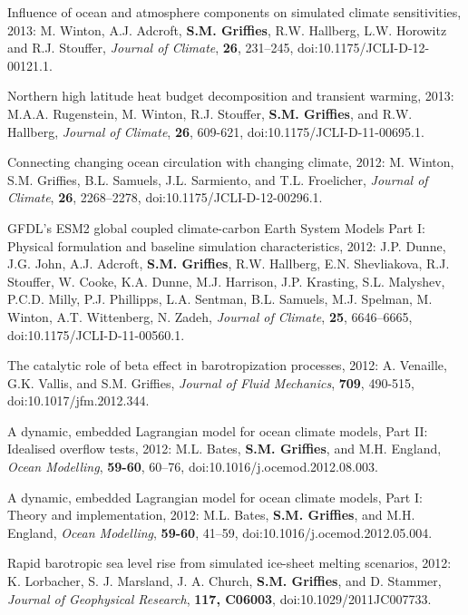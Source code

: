\begin{etaremune}
\item Influence of ocean and atmosphere components on simulated
  climate sensitivities, 2013: M. Winton, A.J. Adcroft, {\bf
    S.M. Grif\/f\/ies}, R.W. Hallberg, L.W. Horowitz and
  R.J. Stouffer, {\it Journal of Climate}, {\bf 26}, 231--245,
  doi:10.1175/JCLI-D-12-00121.1.

\item Northern high latitude heat budget decomposition and transient
  warming, 2013: M.A.A. Rugenstein, M. Winton, R.J. Stouffer, {\bf
    S.M. Grif\/f\/ies}, and R.W. Hallberg, {\it Journal of Climate}, {\bf 26}, 609-621, doi:10.1175/JCLI-D-11-00695.1.

\item Connecting changing ocean circulation with changing climate,
  2012: M. Winton, S.M. Grif\/f\/ies, B.L. Samuels,
  J.L. Sarmiento, and T.L. Froelicher, {\it Journal of Climate}, {\bf 26}, 2268--2278, doi:10.1175/JCLI-D-12-00296.1.

\item GFDL’s ESM2 global coupled climate-carbon Earth System Models
  Part I: Physical formulation and baseline simulation
  characteristics, 2012: J.P. Dunne, J.G. John, A.J. Adcroft, {\bf
    S.M. Grif\/f\/ies}, R.W. Hallberg, E.N. Shevliakova, R.J. Stouffer,
  W. Cooke, K.A. Dunne, M.J. Harrison, J.P. Krasting, S.L. Malyshev,
  P.C.D. Milly, P.J. Phillipps, L.A. Sentman, B.L. Samuels,
  M.J. Spelman, M. Winton, A.T. Wittenberg, N. Zadeh, {\it Journal of
    Climate}, {\bf 25}, 6646--6665,
doi:10.1175/JCLI-D-11-00560.1.

\item The catalytic role of beta effect in barotropization processes,
  2012: A. Venaille, G.K. Vallis, and S.M. Grif\/f\/ies, {\it
    Journal of Fluid Mechanics}, {\bf 709}, 490-515,
  doi:10.1017/jfm.2012.344.

\item A dynamic, embedded Lagrangian model for ocean climate models,
  Part II: Idealised overflow tests, 2012: M.L. Bates, {\bf
    S.M. Grif\/f\/ies}, and M.H. England, {\it Ocean Modelling}, {\bf
    59-60}, 60--76, doi:10.1016/j.ocemod.2012.08.003.

\item A dynamic, embedded Lagrangian model for ocean climate models,
  Part I: Theory and implementation, 2012: M.L. Bates, {\bf
    S.M. Grif\/f\/ies}, and M.H. England, {\it Ocean Modelling}, {\bf
    59-60}, 41--59, doi:10.1016/j.ocemod.2012.05.004.

\item Rapid barotropic sea level rise from simulated ice-sheet melting
  scenarios, 2012: K. Lorbacher, S. J. Marsland, J. A. Church, {\bf
    S.M. Grif\/f\/ies}, and D. Stammer, {\it Journal of Geophysical
    Research}, {\bf 117, C06003}, doi:10.1029/2011JC007733.


\end{etaremune}

